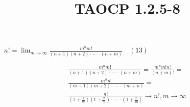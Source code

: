 \documentclass{article}
\title{TAOCP 1.2.5\mbox{-}8}
\begin{document}
\maketitle

\( n! = \lim_{m\to\infty} \frac{m^{n}m!}{(n+1)(n+2) \cdot\ \cdots\ \cdot (n+m)}\quad (13) \)

\begin{multline*}
\frac{m^{n}m!}{(n+1)(n+2) \cdot\ \cdots\ \cdot (n+m)} = \frac{m^{n} m! n!}{(n+m)!} = \\
\frac{m^{n} n!}{(m+1)(m+2) \cdot\ \cdots\ \cdot (m+n)} = \\
\frac{n!}{(1+\frac{1}{m})(1+\frac{2}{m}) \cdot\ \cdots\ \cdot (1+\frac{n}{m})} \to n!, m \to \infty
\end{multline*}
\end{document}
